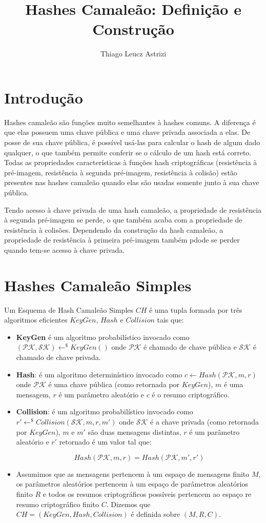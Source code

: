\documentclass[a4paper]{article}
\title{Hashes Camaleão: Definição e Construção}
\author{Thiago Leucz Astrizi}
\begin{document}
\maketitle

\section{Introdução}

Hashes camaleão são funções muito semelhantes à hashes comuns. A
diferença é que elas possuem uma chave pública e uma chave privada
associada a elas. De posse de sua chave pública, é possível usá-las
para calcular o hash de algum dado qualquer, o que também permite
conferir se o cálculo de um hash está correto. Todas as propriedades
características à funções hash criptográficas (resistência à
pré-imagem, resistência à segunda pré-imagem, resistência à colisão)
estão presentes nas hashes camaleão quando elas são usadas somente
junto à sua chave pública.

Tendo acesso à chave privada de uma hash camaleão, a propriedade de
resistência à segunda pré-imagem se perde, o que também acaba com a
propriedade de resistência à colisões. Dependendo da construção da
hash camaleão, a propriedade de resistência à primeira pré-imagem
também pdode se perder quando tem-se acesso à chave privada.


\section{Hashes Camaleão Simples}

Um Esquema de Hash Camaleão Simples $CH$ é uma tupla formada por três
algoritmos eficientes $KeyGen$, $Hash$ e $Collision$ tais que:

\begin{itemize}
\item\textbf{KeyGen} é um algoritmo probabilístico invocado como
  $(\mathcal{PK}, \mathcal{SK}) \leftarrow^\$ KeyGen()$ onde
  $\mathcal{PK}$ é chamado de chave pública e $\mathcal{SK}$ é chamado
  de chave privada.
\item\textbf{Hash}: é um algoritmo determinístico invocado como $c
  \leftarrow Hash(\mathcal{PK}, m, r)$ onde $\mathcal{PK}$ é uma chave
  pública (como retornada por $KeyGen$), $m$ é uma mensagem, $r$ é um
  parâmetro aleatório e $c$ é o resumo criptográfico.
\item\textbf{Collision}: é um algoritmo probabilístico invocado como
  $r' \leftarrow^\$ Collision(\mathcal{SK}, m, r, m')$ onde
  $\mathcal{SK}$ é a chave privada (como retornada por $KeyGen$), $m$
  e $m'$ são duas mensagens distintas, $r$ é um parâmetro aleatório e
  $r'$ retornado é um valor tal que:

  $$ Hash(\mathcal{PK}, m,r) = Hash(\mathcal{PK}, m', r')$$
\item Assumimos que as mensagens pertencem à um espaço de mensagens
  finito $M$, os parâmetros aleatórios pertencem à um espaço de
  parâmetros aleatórios finito $R$ e todos os resumos criptográficos
  possíveis pertencem ao espaço re resumo criptográfico finito $C$.
  Dizemos que $CH=(KeyGen, Hash, Collision)$ é definida sobre $(M, R,
  C)$.
\end{itemize}
\end{document}
